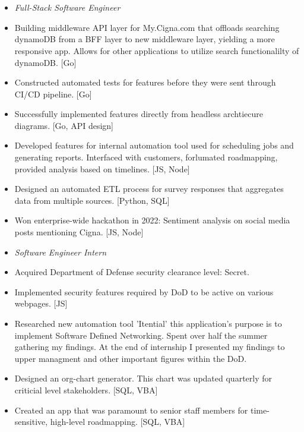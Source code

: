 \documentclass{article}
\begin{document}
\section{\\}
\color{black}
\begin{itemize}
\subsection{\large Cigna\hfill\mdseries July 2021 - Present}
 \item[] \textit{Full-Stack Software Engineer } %
\item Building middleware API layer for My.Cigna.com that offloads searching dynamoDB from a BFF layer to new middleware layer, yielding a more responsive app. Allows for other applications to utilize search functionalilty of dynamoDB. [Go]
\item Constructed automated tests for features before they were sent through CI/CD pipeline. [Go]
\item Successfully implemented features directly from headless archtiecure diagrams. [Go, API design]
\item Developed features for internal automation tool used for scheduling jobs and generating reports. Interfaced with customers, forlumated roadmapping,  provided analysis based on timelines. [JS, Node]
\item Designed an automated ETL process for survey responses that aggregates data from multiple sources. [Python, SQL]
\item Won enterprise-wide hackathon in 2022: Sentiment analysis on social media posts mentioning Cigna. [JS, Node]
\end{itemize}
\begin{itemize}
\subsection{\\\large Leidos\hfill\mdseries Summer 2019/2020}
\item[] \textit{Software Engineer Intern } %
\item Acquired Department of Defense security clearance level: Secret.
\item Implemented security features required by DoD to be active on various webpages. [JS]
\item Researched new automation tool 'Itential' this application's purpose is to implement Software Defined Networking. Spent over half the summer gathering my findings. At the end of internship I presented my findings to upper managment and other important figures within the DoD.
\item Designed an org-chart generator. This chart was updated quarterly for criticial level stakeholders. [SQL, VBA]
\item Created an app that was paramount to senior staff members for time-sensitive, high-level roadmapping. [SQL, VBA]
\end{itemize}
\color{blue}
\end{document}
